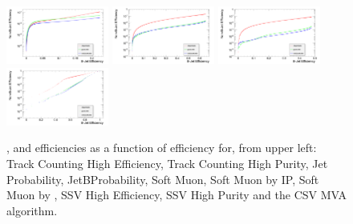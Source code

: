 \begin{figure}[hbtp]
     \includegraphics[width=0.3\textwidth]{Chapters/04_Analysis/04a_BTags/Images/SoftMuonByPt_nonBJetEfficiency_v_bJetEfficiency}\hfill
     \includegraphics[width=0.3\textwidth]{Chapters/04_Analysis/04a_BTags/Images/SimpleSecondaryVertexHighEfficiency_nonBJetEfficiency_v_bJetEfficiency}\hfill
     \includegraphics[width=0.3\textwidth]{Chapters/04_Analysis/04a_BTags/Images/SimpleSecondaryVertexHighPurity_nonBJetEfficiency_v_bJetEfficiency}\\
     \includegraphics[width=0.3\textwidth]{Chapters/04_Analysis/04a_BTags/Images/CombinedSecondaryVertexMVA_nonBJetEfficiency_v_bJetEfficiency}\\
     \caption[]{\cjet, \gjet and \udsjet efficiencies as a function of \bjet efficiency for, from upper left: Track Counting
     High Efficiency, Track Counting High Purity, Jet Probability, JetBProbability, Soft Muon, Soft Muon by IP, Soft Muon by \pt, SSV High Efficiency, SSV
     High Purity and the CSV MVA algorithm.}
     \label{fig:all_algorithm_efficiencies}
\end{figure}
